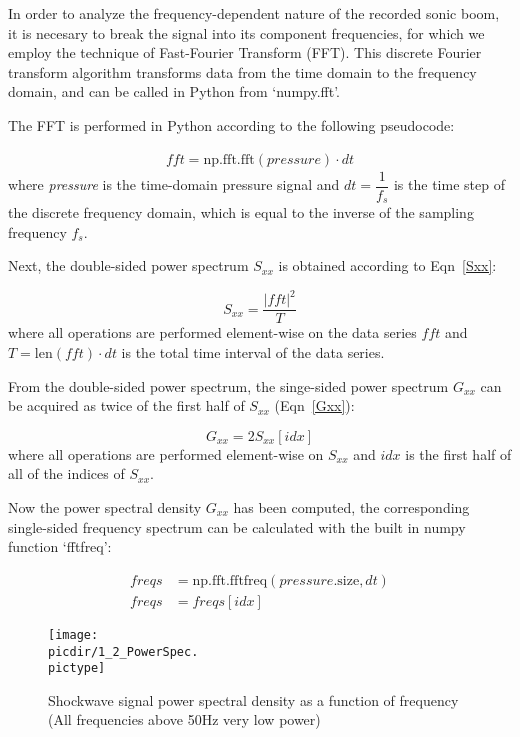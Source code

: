 \documentclass[twocolumn,10pt]{asme2ej}
\begin{document}
In order to analyze the frequency-dependent nature of the recorded sonic boom, it is necesary to break the signal into its component frequencies, for which we employ the technique of Fast-Fourier Transform (FFT).  This discrete Fourier transform algorithm transforms data from the time domain to the frequency domain, and can be called in Python from `numpy.fft'.

The FFT is performed in Python according to the following pseudocode:

\begin{gather*}
fft = \text{np.fft.fft}(pressure)\cdot dt
\end{gather*}
\noindent where \emph{pressure} is the time-domain pressure signal and $dt=\dfrac{1}{f_s}$ is the time step of the discrete frequency domain, which is equal to the inverse of the sampling frequency $f_s$.

\noindent Next, the double-sided power spectrum $S_{xx}$ is obtained according to Eqn~\ref{Sxx}:

\begin{equation} \label{Sxx}
S_{xx} = \frac{|fft|^2}{T}
\end{equation}
\noindent where all operations are performed element-wise on the data series $fft$ and $T=\text{len}(fft)\cdot dt$ is the total time interval of the data series.

From the double-sided power spectrum, the singe-sided power spectrum $G_{xx}$ can be acquired as twice of the first half of $S_{xx}$ (Eqn~\ref{Gxx}):

\begin{equation} \label{Gxx}
G_{xx} = 2S_{xx}[idx]
\end{equation}
\noindent where all operations are performed element-wise on $S_{xx}$ and $idx$ is the first half of all of the indices of $S_{xx}$.

Now the power spectral density $G_{xx}$ has been computed, the corresponding single-sided frequency spectrum can be calculated with the built in numpy function `fftfreq':

\begin{align*}
freqs &= \text{np.fft.fftfreq}(pressure{}\text{.size}, dt) \\
freqs &= freqs[idx]
\end{align*}


\begin{figure}[htb]
\begin{center}
\texttt{[image: \\picdir/1\_2\_PowerSpec.\\pictype]}
\caption{Shockwave signal power spectral density as a function of frequency (All frequencies above 50Hz very low power)}
\label{PowSpec}
\end{center}
\end{figure}
\end{document}
